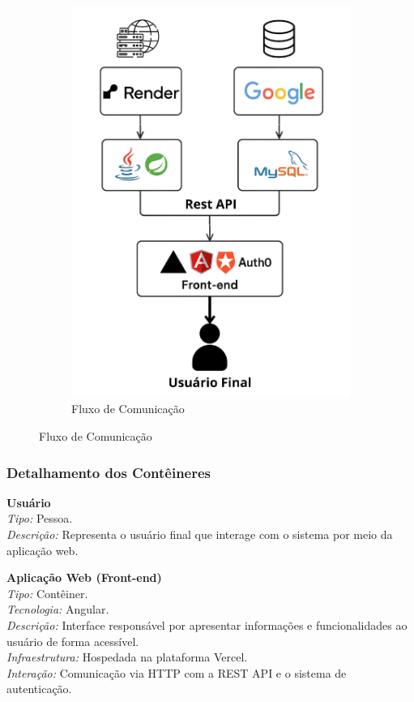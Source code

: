 \documentclass[
	article,			%
	12pt,				%
	oneside,			%
	a4paper,			%
    BIBLATEX,           %
	english,			%
	brazil,				%
	sumario=tradicional
	]{abntex2}
\begin{document}
\begin{figure}[h!]
\begin{subfigure}[b]{0.45\textwidth}
        \includegraphics[width=\textwidth]{Figuras/fluxo_comunicacao.jpg}
        \caption{Fluxo de Comunicação}
        \label{fig:fluxo-comunicacao}
    \end{subfigure}
    \label{fig:arquitetura-software}
\end{figure}

\subsubsection{Detalhamento dos Contêineres}

\textbf{Usuário}\\
\textit{Tipo:} Pessoa.\\
\textit{Descrição:} Representa o usuário final que interage com o sistema por meio da aplicação web.

\textbf{Aplicação Web (Front-end)}\\
\textit{Tipo:} Contêiner.\\
\textit{Tecnologia:} Angular.\\
\textit{Descrição:} Interface responsável por apresentar informações e funcionalidades ao usuário de forma acessível.\\
\textit{Infraestrutura:} Hospedada na plataforma Vercel.\\
\textit{Interação:} Comunicação via HTTP com a REST API e o sistema de autenticação.
\end{document}
